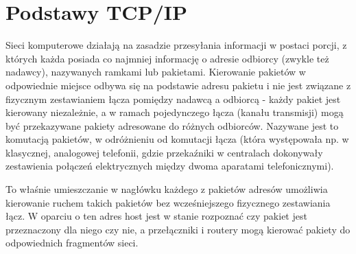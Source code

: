 % 
% 
% 
% 

\section{Podstawy TCP/IP}

Sieci komputerowe działają na zasadzie przesyłania informacji w postaci porcji, z których każda posiada co najmniej informację o adresie odbiorcy (zwykle też nadawcy), nazywanych ramkami lub pakietami. Kierowanie pakietów w odpowiednie miejsce odbywa się na podstawie adresu pakietu i nie jest związane z fizycznym zestawianiem łącza pomiędzy nadawcą a odbiorcą - każdy pakiet jest kierowany niezależnie, a w ramach pojedynczego łącza (kanału transmisji) mogą być przekazywane pakiety adresowane do różnych odbiorców. Nazywane jest to komutacją pakietów, w odróżnieniu od komutacji łącza (która występowała np. w klasycznej, analogowej telefonii, gdzie przekaźniki w centralach dokonywały zestawienia połączeń elektrycznych między dwoma aparatami telefonicznymi).

To właśnie umieszczanie w nagłówku każdego z pakietów adresów umożliwia kierowanie ruchem takich pakietów bez wcześniejszego fizycznego zestawiania łącz. W oparciu o ten adres host jest w stanie rozpoznać czy pakiet jest przeznaczony dla niego czy nie, a przełączniki i routery mogą kierować pakiety do odpowiednich fragmentów sieci.

